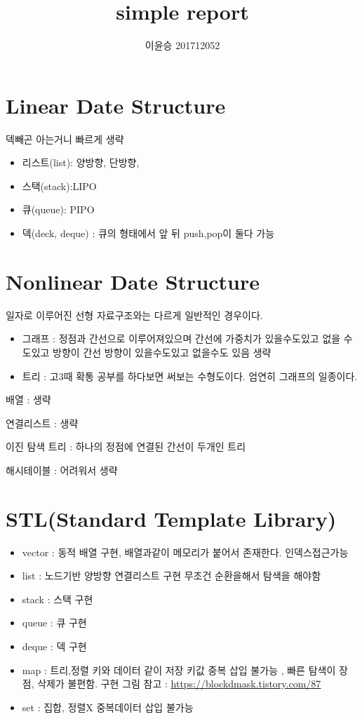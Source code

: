 \documentclass{oblivoir}
\begin{document}
\title{simple report}
\author{이윤승 201712052}
\maketitle
\tableofcontents
\section{Linear Date Structure}
덱빼곤 아는거니 빠르게 생략
\begin{itemize}
    \item  리스트(list): 양방향, 단방향, 
    \item  스택(stack):LIPO 
    \item  큐(queue): PIPO
    \item  덱(deck, deque) : 큐의 형태에서 앞 뒤  push,pop이 둘다 가능
\end{itemize} 

\section{Nonlinear Date Structure}
일자로 이루어진 선형 자료구조와는 다르게 일반적인 경우이다.
\begin{itemize}
    \item 그래프 : 정점과 간선으로 이루어져있으며 간선에 가중치가 있을수도있고 없을 수도있고 방향이 간선 방향이 있을수도있고 없을수도 있음 생략
    \item  트리 : 고3때 확통 공부를 하다보면 써보는 수형도이다. 엄연히 그래프의 일종이다. 
\end{itemize}
 

배열 : 생략

연결리스트 : 생략

이진 탐색 트리 : 하나의 정점에 연결된 간선이 두개인 트리

해시테이블 : 어려워서 생략

\section{STL(Standard Template Library)}

\begin{itemize}
    \item vector : 동적 배열 구현, 배열과같이 메모리가 붙어서 존재한다. 인덱스접근가능
    \item list : 노드기반 양방향 연결리스트 구현 무조건 순환을해서 탐색을 해야함
    \item stack : 스택 구현
    \item queue : 큐 구현
    \item deque : 덱 구현
    \item map : 트리,정렬 키와 데이터 같이 저장 키값 중복 삽입 불가능 , 빠른 탐색이 장점, 삭제가 불편함. 
    구현 그림 참고 : \url{https://blockdmask.tistory.com/87}
    \item set : 집합, 정렬X 중복데이터 삽입 불가능
\end{itemize}
\end{document}
